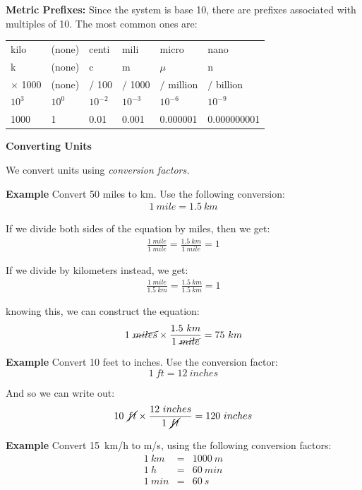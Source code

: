 \documentclass[12pt]{article}
\begin{document}
\vspace{0.1in}
\noindent \textbf{Metric Prefixes:} Since the system is base 10, there are prefixes associated with multiples of 10. The most common ones are:
\vspace{0.1in}

\noindent \begin{tabularx}{\textwidth}{ X X X X X X }
	kilo & (none) & centi & mili & micro & nano \\
	k & (none) & c & m & $\mu$ & n \\
	$\times$ 1000 & (none) & $/$ 100 & $/$ 1000 & $/$ million & $/$ billion \\
	$10^3$ & $10^0$ & $10^{-2}$ & $10^{-3}$ & $10^{-6}$ & $10^{-9}$ \\
	1000 & 1 & 0.01 & 0.001 & 0.000001 & 0.000000001 
\end{tabularx}
\clearpage
\noindent \textbf{\large Converting Units}

We convert units using \textit{conversion factors.}

\noindent\textbf{Example} Convert 50 miles to km. Use the following conversion:
\begin{eqnarray}
1~mile = 1.5~km
\end{eqnarray}

If we divide both sides of the equation by miles, then we get:
\begin{eqnarray}
\frac{1~mile}{1~mile} = \frac{1.5~km}{1~mile} = 1
\end{eqnarray}

If we divide by kilometers instead, we get:
\begin{eqnarray}
\frac{1~mile}{1.5~km} = \frac{1.5~km}{1.5~km} = 1
\end{eqnarray}

knowing this, we can construct the equation:
\begin{eqnarray}
1~\cancel{miles}\times\frac{1.5~km}{1~\cancel{mile}} = 75~km
\end{eqnarray}

\noindent\textbf{Example} Convert 10 feet to inches. Use the conversion factor:
\begin{equation}
1~ft = 12~inches
\end{equation}

And so we can write out:
\begin{eqnarray}
10~\cancel{ft}\times\frac{12~inches}{1~\cancel{ft}} = 120~inches
\end{eqnarray}


\noindent\textbf{Example} Convert 15~km/h to m/s, using the following conversion factors:
\begin{eqnarray}
1~km &=& 1000~m \\
1~h &=& 60~min \\
1~min &=& 60~s
\end{eqnarray}
\end{document}
